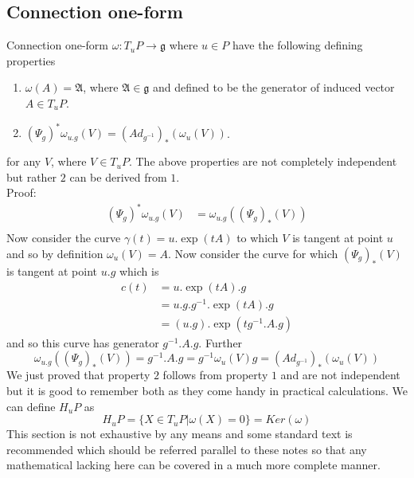 \documentclass[12pt]{article}
\begin{document}
\subsection{Connection one-form}{\label{property}}
Connection one-form $\omega \colon T_{u}P \to \mathfrak{g}$ where $u \in P$ have the following defining properties
\begin{enumerate}
	\item $\omega(A) = \mathfrak{A}$, where $\mathfrak{A} \in \mathfrak{g}$ and defined to be the generator of induced vector $A \in T_{u}P$.
	\item $(\Psi_{g})^{\ast}\omega_{u.g}(V) = (Ad_{g^{-1}})_{\ast}(\omega_{u}(V))$.
\end{enumerate} for any $V$, where $V \in T_{u}P$. The above properties are not completely independent but rather $2$ can be derived from $1$. \\
Proof:
\begin{align*}
    (\Psi_{g})^{\ast}\omega_{u.g}(V) &= \omega_{u.g}((\Psi_{g})_{\ast}(V)) \\
\end{align*} Now consider the curve $\gamma(t)=u.\exp(tA)$ to which $V$ is tangent at point $u$ and so by definition $\omega_{u}(V) = A $. Now consider the curve for which $(\Psi_{g})_{\ast}(V)$ is tangent at point $u.g$ which is
\begin{align*}
    c(t) &= u.\exp(tA).g \\
         &= u.g.g^{-1}.\exp(tA).g \\
         &= (u.g).\exp(tg^{-1}.A.g)
\end{align*} and so this curve has generator $g^{-1}.A.g $. Further \\
\[
\omega_{u.g}((\Psi_{g})_{\ast}(V)) = g^{-1}.A.g = g^{-1}\omega_{u}(V)g = (Ad_{g^{-1}})_{\ast}(\omega_{u}(V))
\] 
We just proved that property $2$ follows from property $1$ and are not independent but it is good to remember both as they come handy in practical calculations.
We can define $H_{u}P$ as
\[
H_{u}P = \{X \in T_{u}P | \omega(X) = 0\} = Ker(\omega)
\]
This section is not exhaustive by any means and some standard text \cite{nakahara_book} is recommended which should be referred parallel to these notes so that any mathematical lacking here can be covered in a much more complete manner.
\end{document}
